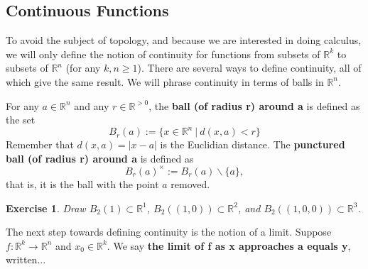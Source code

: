\documentclass[12pt]{amsart}
\newtheorem{exercise}[theorem]{Exercise}
\numberwithin{equation}{section}
\newcommand\Rb{{\mathbb R}} %
\newcommand{\To}{\longrightarrow}
\newcommand{\pipe}{\:|\:}
\begin{document}
\subsection{Continuous Functions} To avoid the subject of topology, and because we are interested in doing calculus, we will only define the notion of continuity for functions from subsets of $\Rb^k$ to subsets of $\Rb^n$ (for any $k,n\geq 1$).  There are several ways to define continuity, all of which give the same result.  We will phrase continuity in terms of balls in $\Rb^n$.

 For any $a\in\Rb^n$ and any $r\in \Rb^{> 0}$, the \textbf{ball (of radius r) around a} is defined as the set
 \[ B_r(a):=\{x\in \Rb^n\pipe d(x,a)<r\} \]
 Remember that $d(x,a)=|x-a|$ is the Euclidian distance.  The \textbf{punctured ball (of radius r) around a} is defined as
 \[ B_r(a)^\times:= B_r(a)\backslash\{a\}, \]
 that is, it is the ball with the point $a$ removed.
\begin{exercise}
Draw $B_2(1)\subset \Rb^1$, $B_2((1,0))\subset \Rb^2$, and $B_2((1,0,0))\subset \Rb^3$.
\end{exercise}

The next step towards defining continuity is the notion of a limit.  Suppose $f:\Rb^k\To \Rb^n$ and $x_0\in\Rb^k$.  We say \textbf{the limit of f as x approaches a equals y}, written...
\end{document}
